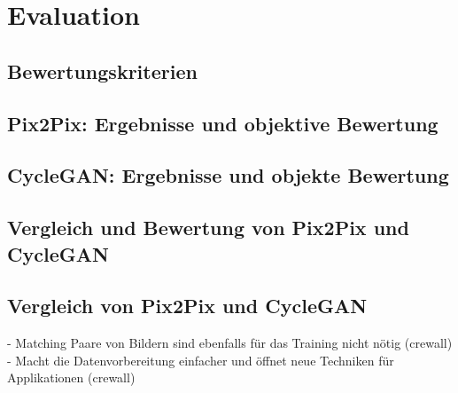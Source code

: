 \chapter{Evaluation}
\section{Bewertungskriterien}
\section{Pix2Pix: Ergebnisse und objektive Bewertung}
\section{CycleGAN: Ergebnisse und objekte Bewertung}
\section{Vergleich und Bewertung von Pix2Pix und CycleGAN}
\section{Vergleich von Pix2Pix und CycleGAN}
- Matching Paare von Bildern sind ebenfalls für das Training nicht nötig (crewall)
- Macht die Datenvorbereitung einfacher und öffnet neue Techniken für Applikationen (crewall)